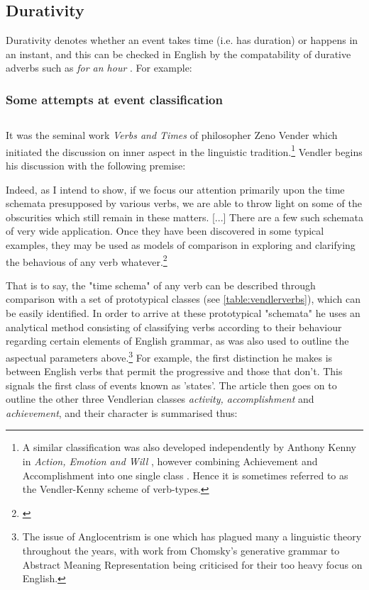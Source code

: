 \subsection*{Durativity}
Durativity denotes whether an event takes time (i.e. has duration) or happens in an instant, and this can be checked in English by the compatability of durative adverbs such as \emph{for an hour} \citep{102998}. For example:
\begin{exe}
\end{exe}
\subsubsection{Some attempts at event classification}
\subsection*{\citet{vendler57}}
It was the seminal work \emph{Verbs and Times} \citep{vendler57} of philosopher Zeno Vender which initiated the discussion on inner aspect in the linguistic tradition.\footnote{A similar classification was also developed independently by Anthony Kenny in \emph{Action, Emotion and Will} \citep{Kenny1963-KENAEA}, however combining Achievement and Accomplishment into one single class \citep{19c36731-bdec-362e-9f45-1aaba76109d7}. Hence it is sometimes referred to as the Vendler-Kenny scheme of verb-types.} Vendler begins his discussion with the following premise:

\begin{displayquote}
    Indeed, as I intend to show, if we focus our attention primarily upon the time schemata presupposed by various verbs, we are able to throw light on some of the obscurities which still remain in these matters. [...] There are a few such schemata of very wide application. Once they have been discovered in some typical examples, they may be used as models of comparison in exploring and clarifying the behavious of any verb whatever.\footnote{\citet{vendler57}}
\end{displayquote}
That is to say, the "time schema" of any verb can be described through comparison with a set of prototypical classes (see \ref{table:vendlerverbs}), which can be easily identified. In order to arrive at these prototypical "schemata" he uses an analytical method consisting of classifying verbs according to their behaviour regarding certain elements of English grammar, as was also used to outline the aspectual parameters above.\footnote{The issue of Anglocentrism is one which has plagued many a linguistic theory throughout the years, with work from Chomsky's generative grammar \citep{LEVISEN2019101173} to Abstract Meaning Representation \citep{damonte2018crosslingual} being criticised for their too heavy focus on English.} For example, the first distinction he makes is between English verbs that permit the progressive and those that don't. This signals the first class of events known as 'states'. The article then goes on to outline the other three Vendlerian classes \emph{activity, accomplishment} and \emph{achievement}, and their character is summarised thus: 

